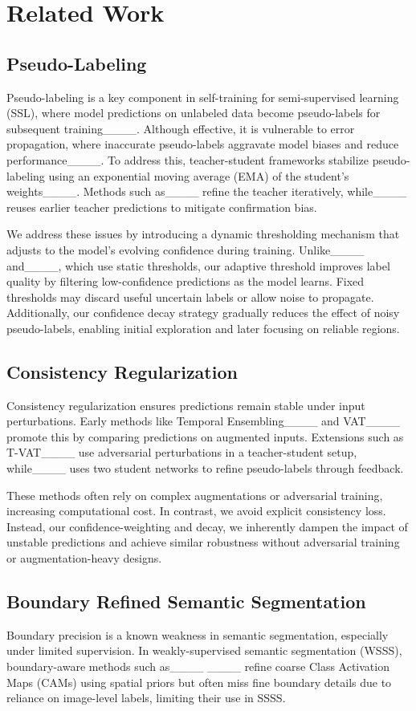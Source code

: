 \section{Related Work}
\subsection{Pseudo-Labeling}
Pseudo-labeling is a key component in self-training for semi-supervised learning (SSL), where model predictions on unlabeled data become pseudo-labels for subsequent training____. Although effective, it is vulnerable to error propagation, where inaccurate pseudo-labels aggravate model biases and reduce performance____. To address this, teacher-student frameworks stabilize pseudo-labeling using an exponential moving average (EMA) of the student’s weights____. Methods such as____ refine the teacher iteratively, while____ reuses earlier teacher predictions to mitigate confirmation bias.

We address these issues by introducing a dynamic thresholding mechanism that adjusts to the model’s evolving confidence during training. Unlike____ and____, which use static thresholds, our adaptive threshold improves label quality by filtering low-confidence predictions as the model learns. Fixed thresholds may discard useful uncertain labels or allow noise to propagate. Additionally, our confidence decay strategy gradually reduces the effect of noisy pseudo-labels, enabling initial exploration and later focusing on reliable regions.

\subsection{Consistency Regularization}
Consistency regularization ensures predictions remain stable under input perturbations. Early methods like Temporal Ensembling____ and VAT____ promote this by comparing predictions on augmented inputs. Extensions such as T-VAT____ use adversarial perturbations in a teacher-student setup, while____ uses two student networks to refine pseudo-labels through feedback.

These methods often rely on complex augmentations or adversarial training, increasing computational cost. In contrast, we avoid explicit consistency loss. Instead, our confidence-weighting and decay, we inherently dampen the impact of unstable predictions and achieve similar robustness without adversarial training or augmentation-heavy designs.

\subsection{Boundary Refined Semantic Segmentation}
Boundary precision is a known weakness in semantic segmentation, especially under limited supervision. In weakly-supervised semantic segmentation (WSSS), boundary-aware methods such as____ ____ refine coarse Class Activation Maps (CAMs) using spatial priors but often miss fine boundary details due to reliance on image-level labels, limiting their use in SSSS.

